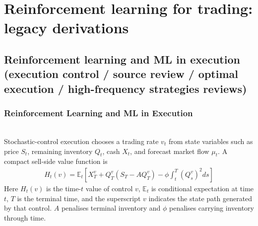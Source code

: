 \documentclass[a4paper,oneside,openany]{book}
\begin{document}
\chapter*{Reinforcement learning for trading: legacy derivations}

\section*{Reinforcement learning and ML in execution (execution control / source review / optimal execution / high-frequency strategies reviews)}

\subsection*{Reinforcement Learning and ML in Execution}

\begin{model} \\
Stochastic-control execution chooses a trading rate $v_t$ from state variables such as price $S_t$, remaining inventory $Q_t$, cash $X_t$, and forecast market flow $\mu_t$. A compact sell-side value function is
\begin{align*}
H_t(v)=\mathbb{E}_t\left[X_T^v+Q_T^v(S_T-AQ_T^v)-\phi\int_t^T(Q_s^v)^2ds\right]
\end{align*}
Here $H_t(v)$ is the time-$t$ value of control $v$, $\mathbb{E}_t$ is conditional expectation at time $t$, $T$ is the terminal time, and the superscript $v$ indicates the state path generated by that control. $A$ penalises terminal inventory and $\phi$ penalises carrying inventory through time.
\end{model}
\end{document}
